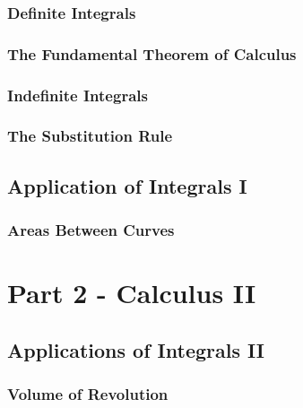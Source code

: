 \documentclass[]{book}
\theoremstyle{definition}
\theoremstyle{definition}
\theoremstyle{definition}
\theoremstyle{remark}
\begin{document}
\hypertarget{definite-integrals}{%
\section{Definite Integrals}\label{definite-integrals}}

\hypertarget{the-fundamental-theorem-of-calculus}{%
\section{The Fundamental Theorem of Calculus}\label{the-fundamental-theorem-of-calculus}}

\hypertarget{indefinite-integrals}{%
\section{Indefinite Integrals}\label{indefinite-integrals}}

\hypertarget{the-substitution-rule}{%
\section{The Substitution Rule}\label{the-substitution-rule}}

\hypertarget{application-of-integrals-i}{%
\chapter{Application of Integrals I}\label{application-of-integrals-i}}

\hypertarget{areas-between-curves}{%
\section{Areas Between Curves}\label{areas-between-curves}}

\hypertarget{part-part-2---calculus-ii}{%
\part*{Part 2 - Calculus II}\label{part-part-2---calculus-ii}}

\hypertarget{applications-of-integrals-ii}{%
\chapter{Applications of Integrals II}\label{applications-of-integrals-ii}}

\hypertarget{volume-of-revolution}{%
\section{Volume of Revolution}\label{volume-of-revolution}}
\end{document}
